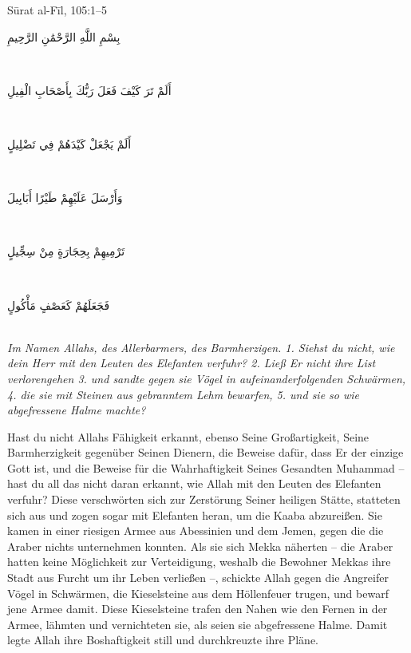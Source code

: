 \begin{quranvers}{Sūrat al-Fīl, 105:1--5}
{\quranfont\begin{Arabic}
بِسْمِ اللَّهِ الرَّحْمَٰنِ الرَّحِيمِ
\end{Arabic}}\\[2mm]
{\quranfont\begin{Arabic}
أَلَمْ تَرَ كَيْفَ فَعَلَ رَبُّكَ بِأَصْحَابِ الْفِيلِ
\end{Arabic}}\\[2mm]
{\quranfont\begin{Arabic}
أَلَمْ يَجْعَلْ كَيْدَهُمْ فِي تَضْلِيلٍ
\end{Arabic}}\\[2mm]
{\quranfont\begin{Arabic}
وَأَرْسَلَ عَلَيْهِمْ طَيْرًا أَبَابِيلَ
\end{Arabic}}\\[2mm]
{\quranfont\begin{Arabic}
تَرْمِيهِمْ بِحِجَارَةٍ مِنْ سِجِّيلٍ
\end{Arabic}}\\[2mm]
{\quranfont\begin{Arabic}
فَجَعَلَهُمْ كَعَصْفٍ مَأْكُولٍ
\end{Arabic}}\\[3mm]
\emph{Im Namen Allahs, des Allerbarmers, des Barmherzigen. 1. Siehst du nicht, wie dein Herr mit
den Leuten des Elefanten verfuhr? 2. Ließ Er nicht ihre List verlorengehen 3. und sandte gegen
sie Vögel in aufeinanderfolgenden Schwärmen, 4. die sie mit Steinen aus gebranntem Lehm
bewarfen, 5. und sie so wie abgefressene Halme machte?}
\end{quranvers}

Hast du nicht Allahs Fähigkeit erkannt, ebenso Seine Großartigkeit, Seine Barmherzigkeit
gegenüber Seinen Dienern, die Beweise dafür, dass Er der einzige Gott ist, und die Beweise für
die Wahrhaftigkeit Seines Gesandten Muhammad  – hast du all das nicht daran erkannt, wie
Allah mit den Leuten des Elefanten verfuhr? Diese verschwörten sich zur Zerstörung Seiner
heiligen Stätte, statteten sich aus und zogen sogar mit Elefanten heran, um die Kaaba
abzureißen. Sie kamen in einer riesigen Armee aus Abessinien und dem Jemen, gegen die die
Araber nichts unternehmen konnten. Als sie sich Mekka näherten – die Araber hatten keine
Möglichkeit zur Verteidigung, weshalb die Bewohner Mekkas ihre Stadt aus Furcht um ihr Leben
verließen –, schickte Allah gegen die Angreifer Vögel in Schwärmen, die Kieselsteine aus dem
Höllenfeuer trugen, und bewarf jene Armee damit. Diese Kieselsteine trafen den Nahen wie den
Fernen in der Armee, lähmten und vernichteten sie, als seien sie abgefressene Halme. Damit
legte Allah ihre Boshaftigkeit still und durchkreuzte ihre Pläne.


